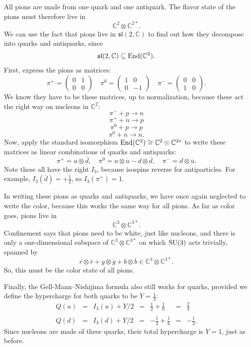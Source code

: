 \documentclass[12pt]{article}
\newcommand{\C}{{\mathbb C}}  %
\newcommand{\SU}{{\rm SU}}    %
\newcommand{\End}{{\rm End}} %
\newcommand{\iso}{\cong} %
\newcommand{\half}{\frac{1}{2}} %
\newcommand{\third}{\frac{1}{3}} %
\newcommand{\twothirds}{\frac{2}{3}} %
\newcommand{\ubar}{\overline{u}} %
\newcommand{\dbar}{\overline{d}} %
\newcommand{\rbar}{{\overline{r}}} %
\newcommand{\gbar}{{\overline{g}}} %
\newcommand{\bbar}{{\overline{b}}} %
\begin{document}
All pions are made from one quark and one
antiquark.  The flavor state of the pions must therefore live in 
\[ \C^2 \otimes \C^{2*}. \]
We can use the fact that pions live in $\mathfrak{sl}(2, \C)$ to find out how
they decompose into quarks and antiquarks, since
\[ \mathfrak{sl}(2, \C) \subseteq \End(\C^2). \]
First, express the pions as matrices:
\[ 
\pi^+ = \left(\begin{array}{cc} 0 & 1 \\ 0 & 0 \end{array} \right) \quad  
\pi^0 = \left(\begin{array}{cc} 1 & 0 \\ 0 & -1 \end{array} \right) \quad
\pi^- = \left(\begin{array}{cc} 0 & 0 \\ 1 & 0 \end{array} \right) .\]
We know they have to be these matrices, up to normalization, because 
these act the right way on nucleons in $\C^2$:
\[	\pi^- + p \to n	\]
\[	\pi^+ + n \to p	\]
\[	\pi^0 + p \to p	\]
\[	\pi^0 + n \to n	.\]
Now, apply the standard isomorphism $\End (\C^2) \iso \C^2 \otimes \C^{2*}$ to
write these matrices as linear combinations of quarks and antiquarks:
\[ \pi^+ = u \otimes \dbar, \quad \pi^0 = u \otimes \ubar - d \otimes \dbar, \quad \pi^- = d \otimes \ubar .\]
Note these all have the right $I_3$, because isospins reverse for
antiparticles. For example, $I_3(\dbar) = +\half$, so $I_3(\pi^+) = 1$.

In writing these pions as quarks and antiquarks, we have once again neglected
to write the color, because this works the same way for all pions.  
As far as color goes, pions live in 
\[ \C^3 \otimes \C^{3*}. \]
Confinement says that pions need to be white, just like nucleons, and 
there is only a one-dimensional subspace of $\C^3 \otimes \C^{3*}$ on
which $\SU(3)$ acts trivially, spanned by
\[ r \otimes \rbar + 
g \otimes \gbar + b \otimes \bbar \in \C^3 \otimes \C^{3*} .\]
So, this must be the color state of all pions.

Finally, the Gell-Mann--Nishijima formula also still works for quarks, 
provided we define the hypercharge for both quarks to be $Y = \third$: 
\[
\begin{array}{ccccrcr}
	Q(u) &=& I_3(u) + Y/2 & = & \half + \frac{1}{6}  &=& \twothirds \\
                                                                        \\
	Q(d) &=& I_3(d) + Y/2 & = & -\half + \frac{1}{6} &=& -\third .  
\end{array}
\]
Since nucleons are made of three quarks, their total hypercharge is $Y = 1$,
just as before.
\end{document}
